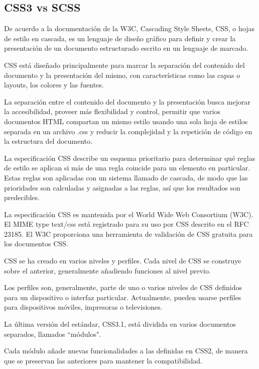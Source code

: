 \subsection{CSS3 vs SCSS}

De acuerdo a la documentación de la W3C\cite{noauthor_what_nodate}, Cascading Style Sheets, CSS, o hojas de estilo en cascada, es un lenguaje de diseño gráfico para definir y crear la presentación de un documento estructurado escrito en un lenguaje de marcado.


CSS está diseñado principalmente para marcar la separación del contenido del documento y la presentación del mismo, con características como las capas o layouts, los colores y las fuentes.


La separación entre el contenido del documento y la presentación busca mejorar la accesibilidad, proveer más flexibilidad y control, permitir que varios documentos HTML compartan un mismo estilo usando una sola hoja de estilos separada en un archivo .css y reducir la complejidad y la repetición de código en la estructura del documento.


La especificación CSS describe un esquema prioritario para determinar qué reglas de estilo se aplican si más de una regla coincide para un elemento en particular. Estas reglas son aplicadas con un sistema llamado de cascada, de modo que las prioridades son calculadas y asignadas a las reglas, así que los resultados son predecibles.


La especificación CSS es mantenida por el World Wide Web Consortium (W3C). El MIME type text/css está registrado para su uso por CSS descrito en el RFC 23185​. El W3C proporciona una herramienta de validación de CSS gratuita para los documentos CSS.



CSS se ha creado en varios niveles y perfiles. Cada nivel de CSS se construye sobre el anterior, generalmente añadiendo funciones al nivel previo.


Los perfiles son, generalmente, parte de uno o varios niveles de CSS definidos para un dispositivo o interfaz particular. Actualmente, pueden usarse perfiles para dispositivos móviles, impresoras o televisiones.


La última versión del estándar, CSS3.1, está dividida en varios documentos separados, llamados ``módulos".


Cada módulo añade nuevas funcionalidades a las definidas en CSS2, de manera que se preservan las anteriores para mantener la compatibilidad.


